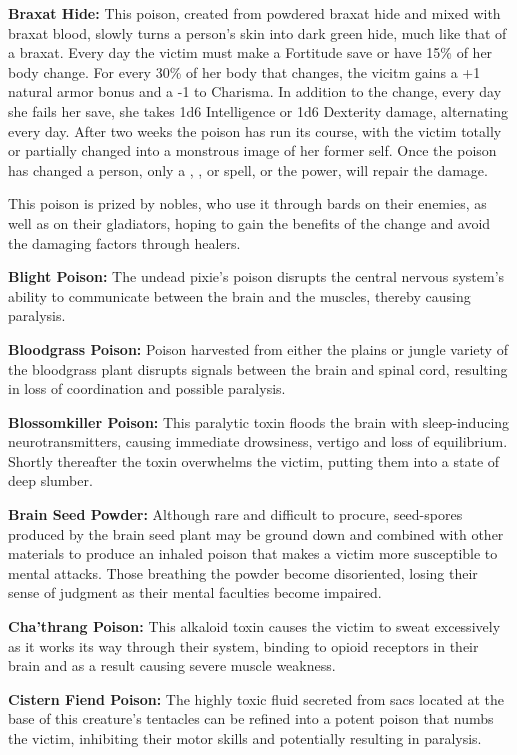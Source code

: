 \textbf{Braxat Hide:} This poison, created from powdered braxat hide and mixed with braxat blood, slowly turns a person's skin into dark green hide, much like that of a braxat. Every day the victim must make a Fortitude save or have 15\% of her body change. For every 30\% of her body that changes, the vicitm gains a +1 natural armor bonus and a -1 to Charisma. In addition to the change, every day she fails her save, she takes 1d6 Intelligence or 1d6 Dexterity damage, alternating every day. After two weeks the poison has run its course, with the victim totally or partially changed into a monstrous image of her former self. Once the poison has changed a person, only a , ,  or  spell, or the  power, will repair the damage.

This poison is prized by nobles, who use it through bards on their enemies, as well as on their gladiators, hoping to gain the benefits of the change and avoid the damaging factors through healers.

\textbf{Blight Poison:} The undead pixie's poison disrupts the central nervous system's ability to communicate between the brain and the muscles, thereby causing paralysis.

\textbf{Bloodgrass Poison:} Poison harvested from either the plains or jungle variety of the bloodgrass plant disrupts signals between the brain and spinal cord, resulting in loss of coordination and possible paralysis.

\textbf{Blossomkiller Poison:} This paralytic toxin floods the brain with sleep-inducing neurotransmitters, causing immediate drowsiness, vertigo and loss of equilibrium. Shortly thereafter the toxin overwhelms the victim, putting them into a state of deep slumber.

\textbf{Brain Seed Powder:} Although rare and difficult to procure, seed-spores produced by the brain seed plant may be ground down and combined with other materials to produce an inhaled poison that makes a victim more susceptible to mental attacks. Those breathing the powder become disoriented, losing their sense of judgment as their mental faculties become impaired.


\textbf{Cha'thrang Poison:} This alkaloid toxin causes the victim to sweat excessively as it works its way through their system, binding to opioid receptors in their brain and as a result causing severe muscle weakness.

\textbf{Cistern Fiend Poison:} The highly toxic fluid secreted from sacs located at the base of this creature's tentacles can be refined into a potent poison that numbs the victim, inhibiting their motor skills and potentially resulting in paralysis.

